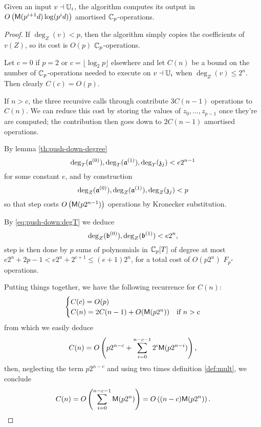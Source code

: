 \begin{theorem}
  Given an input $v\dashv\mathbb{U}_i$, the algorithm  computes
  its output in $O\left(\mathrm{\sf M}(p^{i+1}d)\log(p^id)\right)$ amortised
  $\mathbb{C}_p$-operations.
\end{theorem}
\begin{proof}
  If $\deg_Z(v) < p$, then the algorithm simply copies the
  coefficients of $v(Z)$, so its cost is $O(p)$ $\mathbb{C}_p$-operations.

  Let $c=0$ if $p=2$ or $c = \lfloor\log_2p\rfloor$ elsewhere and let
  $C(n)$ be a bound on the number of $\mathbb{C}_p$-operations needed to
  execute  on $v\dashv\mathbb{U}_i$ when $\deg_Z(v)\le
  2^n$. Then clearly $C(c) = O(p)$.

  If $n > c$, the three recursive calls 
  through  contribute $3C(n-1)$ operations
  to $C(n)$. We can reduce this cost by storing the values of
  $z_0,\ldots,z_{p-1}$ once they're are computed; the contribution
  then goes down to $2C(n-1)$ amortised operations.

  By lemma \ref{th:push-down-degree}
  \begin{equation}
    \label{eq:push-down:degT}
    \deg_T(\mathfrak{a}^{(0)}), \deg_T(\mathfrak{a}^{(1)}), \deg_T(\mathfrak{z}_j) < e2^{n-1}
  \end{equation}
  for some constant $e$, and by construction
  \[\deg_Z(\mathfrak{a}^{(0)}), \deg_Z(\mathfrak{a}^{(1)}), \deg_Z(\mathfrak{z}_j) < p\]
  so that step  costs
  $O\left(\mathrm{\sf M}(p2^{n-1})\right)$ operations by Kronecker substitution.
  
  By \eqref{eq:push-down:degT} we deduce
  \[\deg_Z(\mathfrak{b}^{(0)}), \deg_Z(\mathfrak{b}^{(1)}) < e2^n \text{,}\]
  step  is then done by $p$ sums of
  polynomials in $\mathbb{C}_p[T]$ of degree at most $e2^n+2p-1 < e2^n+2^{c+1}
  \le (e+1)2^n$, for a total cost of $O(p2^n)$ $F_p$-operations.

  Putting things together, we have the following recurrence for
  $C(n)$:
  \begin{equation*}
    \begin{cases}
      C(c) = O(p)\\
      C(n) = 2C(n-1) + O(\mathrm{\sf M}(p2^n)) &\text{if $n>c$}
    \end{cases}
  \end{equation*}
  from which we easily deduce
  \[C(n) = O\left(p2^{n-c} +
  \sum_{i=0}^{n-c-1} 2^i\mathrm{\sf M}(p2^{n-i})\right)\text{,}\]
  then, neglecting the term $p2^{n-c}$ and using two times definition
  \ref{def:mult}, we conclude
  \[C(n) = O\left(\sum_{i=0}^{n-c-1} \mathrm{\sf M}(p2^n)\right) =
  O\left((n-c)\mathrm{\sf M}(p2^n)\right) \text{.}\]


\end{proof}
